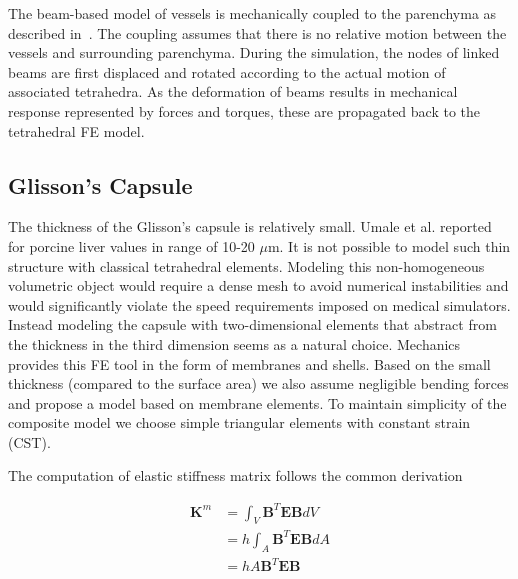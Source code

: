 \documentclass{llncs}
\newcommand{\Mat}[1]{\mathbf{#1}}
\begin{document}
The beam-based model of vessels is mechanically coupled to the parenchyma as described in~\cite{Peterlik2012}. 
The coupling assumes that there is no relative motion between the vessels and surrounding parenchyma. 
During the simulation, the nodes of linked beams are first displaced and rotated according to the actual motion of associated tetrahedra. 
As the deformation of beams results in mechanical response represented by forces and torques, these are propagated back to 
the tetrahedral FE model. 



\subsection{Glisson's Capsule} %

The thickness of the Glisson's capsule is relatively small. Umale et al.
\cite{Umale2011} reported for porcine liver values in range of 10-20
$\mu$m.
It is not possible to model such thin structure with classical tetrahedral
elements. Modeling this non-homogeneous volumetric object would require a
dense mesh to avoid numerical instabilities and would significantly
violate the speed requirements imposed on medical simulators.
Instead modeling the capsule with two-dimensional elements that abstract from the
thickness in the third dimension seems
as a natural choice. Mechanics provides this FE tool in the form of membranes
and shells. Based on the small thickness (compared to the surface area) we also
assume negligible bending forces and propose a model based on membrane
elements. 
To maintain simplicity of the composite model we choose simple triangular
elements with constant strain (CST).

The computation of elastic stiffness matrix follows the common derivation

\begin{eqnarray}
  \Mat{K}^m & = \int_V \Mat{B}^T \Mat{E} \Mat{B} dV     \label{mem1} \\
            & = h \int_A \Mat{B}^T \Mat{E} \Mat{B} dA   \label{mem2} \\
            & = h A \Mat{B}^T \Mat{E} \Mat{B}           \label{mem3}
\end{eqnarray}
\end{document}
